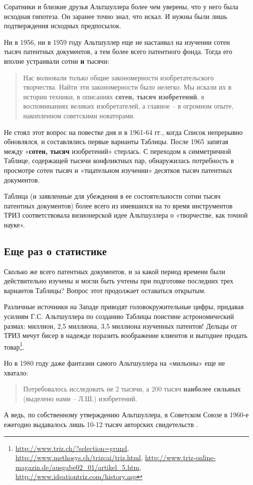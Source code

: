 \documentclass[11pt,a4paper]{article}
\begin{document}
Соратники и близкие друзья Альтшуллера более чем уверены, что у него была
исходная гипотеза. Он заранее точно знал, что искал. И нужны были лишь
подтверждения исходных предпосылок.

Ни в 1956, ни в 1959 году Альтшуллер еще не настаивал на изучении сотен тысяч
патентных документов, а тем более всего патентного фонда. Тогда его вполне
устраивали сотни \textbf{и} тысячи:
\begin{quote}
  Нас волновали только общие закономерности изобретательского творчества.
  Найти эти закономерности было нелегко. Мы искали их в истории техники, в
  описаниях \textbf{сотен, тысяч изобретений}, в воспоминаниях великих
  изобретателей, а главное -- в огромном опыте, накопленном советскими
  новаторами.  \cite{Altshuller1959}
\end{quote}
Не стоял этот вопрос на повестке дня и в 1961-64 гг., когда Список непрерывно
обновлялся, и составлялись первые варианты Таблицы. После 1965 запятая между
«\textbf{сотен, тысяч} изобретений» стерлась. С переходом к симметричной
Таблице, содержащей тысячи конфликтных пар, обнаружилась потребность в
просмотре сотен тысяч и «тщательном изучении» десятков тысяч патентных
документов.

Таблица (и заявленные для убеждения в ее состоятельности сотни тысяч патентных
документов) более всего из имевшихся на то время инструментов ТРИЗ
соответствовала визионерской идее Альтшуллера о «творчестве, как точной
науке».

\subsection*{Еще раз о статистике}

Сколько же всего патентных документов, и за какой период времени были
действительно изучены и могли быть учтены при подготовке последних трех
вариантов Таблицы? Вопрос этот продолжает оставаться открытым.

Различные источники на Западе приводят головокружительные цифры, придавая
усилиям Г.С. Альтшуллера по созданию Таблицы поистине астрономический размах:
миллион, 2{,}5 миллиона, 3{,}5 миллиона изученных патентов! Дельцы от ТРИЗ
мечут бисер в надежде поразить воображение клиентов и выгоднее продать
товар\footnote{\raggedright \url{http://www.triz.ch/?selection=grund},
  \url{http://www.methosys.ch/trizcai/triz.html},
  \url{http://www.triz-online-magazin.de/ausgabe02_01/artikel_5.htm},
  \url{http://www.ideationtriz.com/history.asp}}.

Но в 1980 году даже фантазии самого Альтшуллера на «мильоны» еще не хватало:
\begin{quote}
  Потребовалось исследовать не 2 тысячи, а 200 тысяч \textbf{наиболее сильных}
  (выделено нами -- Л.Ш.) изобретений. \cite{Altshuller1980} 
\end{quote}
А ведь, по собственному утверждению Альтшуллера, в Советском Союзе в 1960-е
ежегодно выдавалось лишь 10-12 тысяч авторских свидетельств
\cite{Altshuller1965}.
\end{document}
